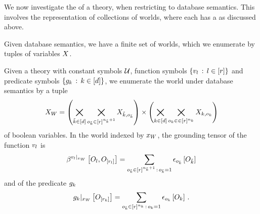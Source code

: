 \sect{\SemanticStructure{}}

We now investigate the \semanticStructure{} of a \firstOrderLogic{} theory, when restricting to database semantics.
This involves the representation of collections of worlds, where each has a \substitutionStructure{} as discussed above.


Given database semantics, we have a finite set of worlds, which we enumerate by tuples of variables $X$.

\begin{definition}
    \label{def:worldEnumeratingVariables}
    Given a \firstOrderLogic{} theory with constant symbols $\mathcal{U}$, function symbols $\{v_{l}\,:\,l\in[r]\}$ and predicate symbols $\{g_{k}\,:\,k\in[d]\}$, we enumerate the world under database semantics by a tuple
    \begin{align*}
        X_{W}
        = \left(\bigtimes_{\tilde{k}\in[d]}\bigtimes_{o_{\tilde{k}}\in[r]^{n_{\tilde{k}}+1}} X_{\tilde{k},o_{\tilde{k}}} \right)
        \times \left(\bigtimes_{k\in[d]}\bigtimes_{o_{k}\in\in[r]^{n_{k}}} X_{k,o_{k}} \right)
    \end{align*}
    of boolean variables.
    In the world indexed by $x_{W}$, the grounding tensor of the function $v_{l}$ is
    \begin{align*}
        \beta^{{v_{l}}|_{x_{W}}}\left[O_{l},O_{[r_{l}]}\right]
        = \sum_{o_{\tilde{k}}\in[r]^{n_{\tilde{k}}+1}\,:\,o_{\tilde{k}}=1} \epsilon_{o_{\tilde{k}}}\left[O_{\tilde{k}}\right]
    \end{align*}
    and of the predicate $g_{k}$
    \begin{align*}
        {g_{k}}|_{x_{W}} \left[O_{[r_{k}]}\right]
        = \sum_{o_{\tilde{k}}\in[r]^{n_{k}}\,:\,o_{k}=1}
        \epsilon_{o_{k}}\left[O_{k}\right] \, .
    \end{align*}
\end{definition}

